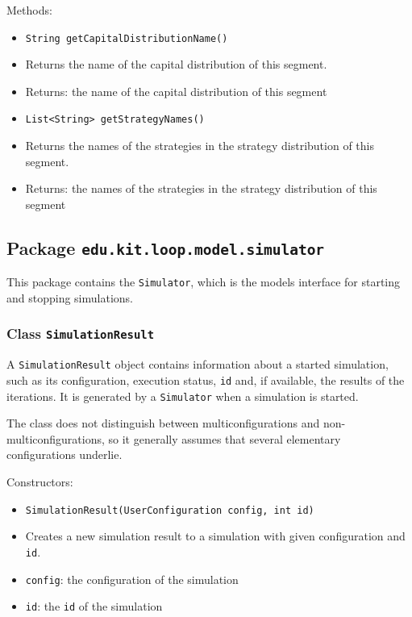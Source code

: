 \documentclass[parskip=full,11pt]{scrartcl}
\begin{document}
Methods:
\begin{itemize}\itemsep -10pt
\item \texttt{String getCapitalDistributionName()}
\item[] Returns the name of the capital distribution of this segment.
\item[] Returns: the name of the capital distribution of this segment

\item \texttt{List<String> getStrategyNames()}
\item[] Returns the names of the strategies in the strategy distribution of this segment.
\item[] Returns: the names of the strategies in the strategy distribution of this segment
\end{itemize}


\subsection{Package \texttt{edu.kit.loop.model.simulator}}
This package contains the \texttt{Simulator}, which is the models interface for starting and stopping simulations.

\subsubsection{Class \texttt{SimulationResult}}
A \texttt{SimulationResult} object contains information about a started simulation, such as its configuration, execution status, \texttt{id} and, if available, the results of the iterations. It is generated by a \texttt{Simulator} when a simulation is started.

The class does not distinguish between multiconfigurations and non-multiconfigurations, so it generally assumes that several elementary configurations underlie.

Constructors:
\begin{itemize} \itemsep -10pt
	\item \texttt{SimulationResult(UserConfiguration config, int id)}
	\item[] Creates a new simulation result to a simulation with given configuration and \texttt{id}.
	\item[] \texttt{config}: the configuration of the simulation
	\item[] \texttt{id}: the \texttt{id} of the simulation
\end{itemize}
\end{document}
